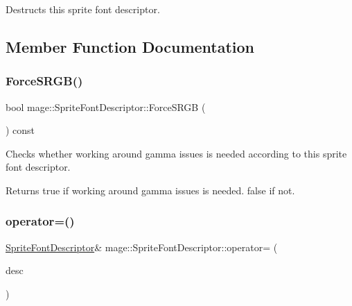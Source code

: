 Destructs this sprite font descriptor. 

\subsection{Member Function Documentation}
\hypertarget{structmage_1_1_sprite_font_descriptor_a255defd4a4d706c37a755c0144c2a927}{}\label{structmage_1_1_sprite_font_descriptor_a255defd4a4d706c37a755c0144c2a927} 
\subsubsection{\texorpdfstring{Force\+S\+R\+G\+B()}{ForceSRGB()}}
{\footnotesize\ttfamily bool mage\+::\+Sprite\+Font\+Descriptor\+::\+Force\+S\+R\+GB (\begin{DoxyParamCaption}{ }\end{DoxyParamCaption}) const}

Checks whether working around gamma issues is needed according to this sprite font descriptor.

\begin{DoxyReturn}{Returns}
{\ttfamily true} if working around gamma issues is needed. {\ttfamily false} if not. 
\end{DoxyReturn}
\hypertarget{structmage_1_1_sprite_font_descriptor_a2279d65420bd8230a334c4ceb560fcf6}{}\label{structmage_1_1_sprite_font_descriptor_a2279d65420bd8230a334c4ceb560fcf6} 
\subsubsection{\texorpdfstring{operator=()}{operator=()}\hspace{0.1cm}{\footnotesize\ttfamily [1/2]}}
{\footnotesize\ttfamily \hyperlink{structmage_1_1_sprite_font_descriptor}{Sprite\+Font\+Descriptor}\& mage\+::\+Sprite\+Font\+Descriptor\+::operator= (\begin{DoxyParamCaption}\item[{const \hyperlink{structmage_1_1_sprite_font_descriptor}{Sprite\+Font\+Descriptor} \&}]{desc }\end{DoxyParamCaption})\hspace{0.3cm}{\ttfamily [default]}}

